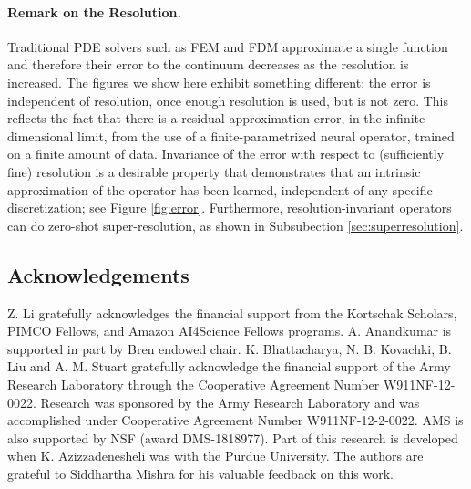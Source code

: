 \documentclass[twoside,11pt]{article}
\begin{document}
\paragraph{Remark on the Resolution.}
Traditional PDE solvers such as FEM and FDM approximate a single function and therefore their error to the continuum decreases as the resolution is increased. The figures we show here exhibit
something different: the error is independent of resolution,
once enough resolution is used, but is not zero.
This reflects the fact that there
is a residual approximation error, in the infinite dimensional
limit, from the use of a finite-parametrized neural
operator, trained on a finite amount of data. Invariance of the error with respect to
(sufficiently fine) resolution is a desirable property that
demonstrates that an intrinsic approximation of the
operator has been learned, independent of any specific
discretization; see Figure \ref{fig:error}. Furthermore, resolution-invariant operators can do zero-shot super-resolution, as shown in Subsubection \ref{sec:superresolution}.
















%
%


%
%






\newpage

\subsection*{Acknowledgements}
Z. Li gratefully acknowledges the financial support from the Kortschak Scholars, PIMCO Fellows, and Amazon AI4Science Fellows programs.
A. Anandkumar is supported in part by Bren endowed chair. 
K. Bhattacharya, N. B. Kovachki, B. Liu and A. M. Stuart gratefully acknowledge the financial support of the Army Research Laboratory through the Cooperative Agreement Number W911NF-12-0022. Research was sponsored by the Army Research Laboratory and was accomplished under Cooperative Agreement Number W911NF-12-2-0022. 
AMS is also supported by NSF (award DMS-1818977). 
Part of this research is developed when K. Azizzadenesheli was with the Purdue University. The authors are grateful to Siddhartha Mishra for his valuable feedback on this work.
\end{document}
